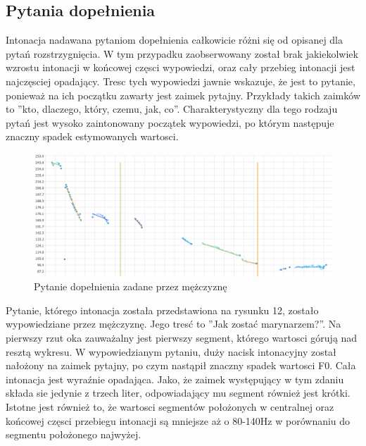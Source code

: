 \documentclass[a4paper,12 pt]{article}
\begin{document}
\subsection{Pytania dopełnienia}
Intonacja nadawana pytaniom dopełnienia całkowicie różni się od opisanej dla pytań rozstrzygnięcia. W tym przypadku zaobserwowany został brak jakiekolwiek wzrostu intonacji w końcowej częsci wypowiedzi, oraz cały przebieg intonacji jest najczęsciej opadający. Tresc tych wypowiedzi jawnie wskazuje, że jest to pytanie, ponieważ na ich początku zawarty jest zaimek pytajny. Przykłady takich zaimków to ''kto, dlaczego, który, czemu, jak, co''. Charakterystyczny dla tego rodzaju pytań jest wysoko zaintonowany początek wypowiedzi,  po którym następuje znaczny spadek estymowanych wartosci.
 \FloatBarrier
\begin{figure}[h]
\centering
\includegraphics[scale=0.7]{pytanie_uzupelnienia_marynarz.png}
\caption{Pytanie dopełnienia zadane przez mężczyznę}
\end{figure}
\FloatBarrier
Pytanie, którego intonacja została przedstawiona na rysunku 12, zostało wypowiedziane przez mężczyznę. Jego tresć to ''Jak zostać marynarzem?''. Na pierwszy rzut oka zauważalny jest pierwszy segment, którego wartosci górują nad resztą wykresu. W wypowiedzianym pytaniu, duży nacisk intonacyjny został nałożony na zaimek pytajny, po czym nastąpił znaczny spadek wartosci F0. Cała intonacja jest wyraźnie opadająca. Jako, że zaimek występujący w tym zdaniu składa sie jedynie z trzech liter, odpowiadający mu segment również jest krótki. Istotne jest również to, że wartosci segmentów położonych w centralnej oraz końcowej częsci przebiegu intonacji są mniejsze aż o 80-140Hz w porównaniu do segmentu położonego najwyżej.
\end{document}

